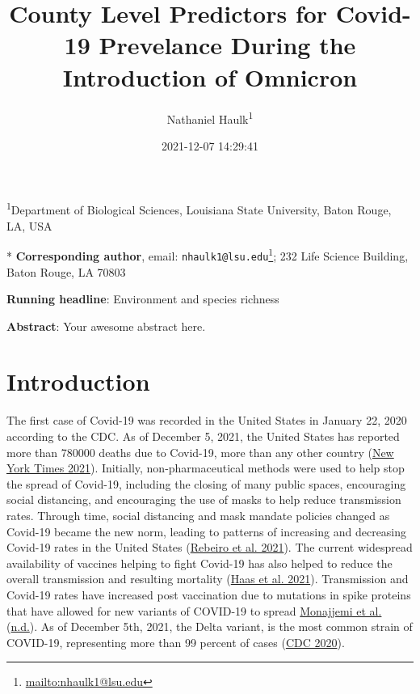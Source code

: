 \documentclass[
  12pt,
]{article}
\title{County Level Predictors for Covid-19 Prevelance During the Introduction of Omnicron}
\author{Nathaniel Haulk\textsuperscript{1}}
\date{2021-12-07 14:29:41}
\DeclareRobustCommand{\href}[2]{#2\footnote{\url{#1}}}
\begin{document}
\maketitle

\renewcommand{\figurename}{{\textbf{Figure}}}
\renewcommand{\tablename}{{\textbf{Table}}}

\footnotesize

\textsuperscript{1}Department of Biological Sciences, Louisiana State University, Baton Rouge, LA, USA

* \textbf{Corresponding author}, email: \href{mailto:nhaulk1@lsu.edu}{\nolinkurl{nhaulk1@lsu.edu}}; 232 Life Science Building, Baton Rouge, LA 70803

\normalsize

\textbf{Running headline}: Environment and species richness

\textbf{Abstract}: Your awesome abstract here.

\clearpage

\hypertarget{introduction}{%
\section{Introduction}\label{introduction}}

The first case of Covid-19 was recorded in the United States in January 22, 2020 according to the CDC. As of December 5, 2021, the United States has reported more than 780000 deaths due to Covid-19, more than any other country (\protect\hyperlink{ref-new_york_times_coronavirus_2021}{New York Times 2021}). Initially, non-pharmaceutical methods were used to help stop the spread of Covid-19, including the closing of many public spaces, encouraging social distancing, and encouraging the use of masks to help reduce transmission rates. Through time, social distancing and mask mandate policies changed as Covid-19 became the new norm, leading to patterns of increasing and decreasing Covid-19 rates in the United States (\protect\hyperlink{ref-rebeiro_impact_2021}{Rebeiro et al. 2021}). The current widespread availability of vaccines helping to fight Covid-19 has also helped to reduce the overall transmission and resulting mortality (\protect\hyperlink{ref-haas_infections_2021}{Haas et al. 2021}). Transmission and Covid-19 rates have increased post vaccination due to mutations in spike proteins that have allowed for new variants of COVID-19 to spread \protect\hyperlink{ref-monajjemi_delta_nodate}{Monajjemi et al.} (\protect\hyperlink{ref-monajjemi_delta_nodate}{n.d.}). As of December 5th, 2021, the Delta variant, is the most common strain of COVID-19, representing more than 99 percent of cases (\protect\hyperlink{ref-cdc_covid_2020}{CDC 2020}).
\end{document}
